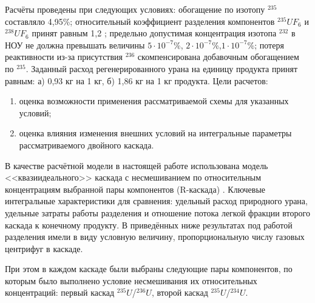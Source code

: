Расчёты проведены при следующих условиях: обогащение по изотопу $^{235}$ составляло 4,95\%; относительный коэффициент разделения компонентов $^{235}UF_6$ и $^{238}UF_6$ принят равным 1,2 \cite{smirnovObogashchenieRegenerirovannogoUrana2018}; предельно допустимая концентрация изотопа $^{232}$ в НОУ не должна превышать величины $5\cdot10^{-7}$\%, $2\cdot10^{-7}$\%,$1\cdot10^{-7}$\%; потеря реактивности из-за присутствия $^{236}$ скомпенсирована добавочным обогащением по $^{235}$. Заданный расход регенерированного урана на единицу продукта принят равным:
а) 0,93 кг на 1 кг,
б) 1,86 кг на 1 кг продукта.
Цели расчетов:
\begin{enumerate}
  \item оценка возможности применения рассматриваемой схемы для указанных условий;
  \item оценка влияния изменения внешних условий на интегральные параметры рассматриваемого двойного каскада.
\end{enumerate}

В качестве расчётной модели в настоящей работе использована модель <<квазиидеального>> каскада \cite{sazykinKvaziidealnyeKaskadyDlya2000} с несмешиванием по относительным концентрациям выбранной пары компонентов (R-каскада) \cite{sulaberidzeTeoriyaKaskadovDlya2011}.
Ключевые интегральные характеристики для сравнения: удельный расход природного урана, удельные затраты работы разделения и отношение потока легкой фракции второго каскада к конечному продукту. В приведённых ниже результатах под работой разделения имели в виду условную величину, пропорциональную числу газовых центрифуг в каскаде. 

При этом в каждом каскаде были выбраны следующие пары компонентов, по которым было выполнено условие несмешивания их относительных концентраций: первый каскад $^{235}U$/$^{236}U$, второй каскад $^{235}U$/$^{234}U$.

